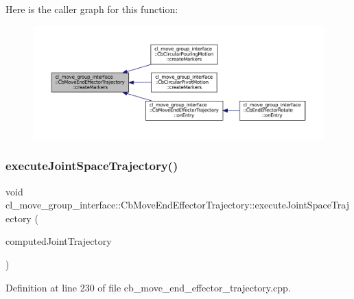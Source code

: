 Here is the caller graph for this function\+:
\nopagebreak
\begin{figure}[H]
\begin{center}
\leavevmode
\includegraphics[width=350pt]{classcl__move__group__interface_1_1CbMoveEndEffectorTrajectory_a442efa1d5bc9e9a16f74ecd31b13d9b5_icgraph}
\end{center}
\end{figure}
\mbox{\label{classcl__move__group__interface_1_1CbMoveEndEffectorTrajectory_a3a75fa185c62591e1869427650338a32}} 
\subsubsection{\texorpdfstring{execute\+Joint\+Space\+Trajectory()}{executeJointSpaceTrajectory()}}
{\footnotesize\ttfamily void cl\+\_\+move\+\_\+group\+\_\+interface\+::\+Cb\+Move\+End\+Effector\+Trajectory\+::execute\+Joint\+Space\+Trajectory (\begin{DoxyParamCaption}\item[{const moveit\+\_\+msgs\+::\+Robot\+Trajectory \&}]{computed\+Joint\+Trajectory }\end{DoxyParamCaption})\hspace{0.3cm}{\ttfamily [protected]}}



Definition at line 230 of file cb\+\_\+move\+\_\+end\+\_\+effector\+\_\+trajectory.\+cpp.



